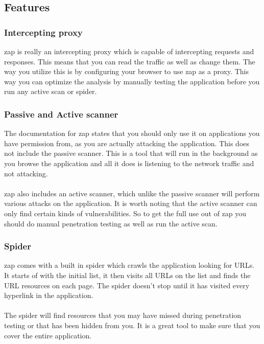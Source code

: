 \documentclass[11pt,english,a4paper]{report}
\begin{document}
\subsection{Features}
\subsubsection{Intercepting proxy}
\gls{zap} is really an intercepting proxy which is capable of intercepting requests and responses.
This means that you can read the traffic as well as change them.
The way you utilize this is by configuring your browser to use \gls{zap} as a proxy.
This way you can optimize the analysis by manually testing the application before you run any active scan or spider.
\subsubsection{Passive and Active scanner}
The documentation for \gls{zap} states that you should only use it on applications you have permission from, as you are actually attacking the application. 
This does not include the passive scanner. 
This is a tool that will run in the background as you browse the application and all it does is listening to the network traffic and not attacking. 

\paragraph{}
\gls{zap} also includes an active scanner, which unlike the passive scanner will perform various attacks on the application. 
It is worth noting that the active scanner can only find certain kinds of vulnerabilities. 
So to get the full use out of \gls{zap} you should do manual penetration testing as well as run the active scan.

\subsubsection{Spider}
\gls{zap} comes with a built in spider which crawls the application looking for URLs.
It starts of with the initial list, it then visits all URLs on the list and finds the URL resources on each page. 
The spider doesn't stop until it has visited every hyperlink in the application.

\paragraph{}
The spider will find resources that you may have missed during penetration testing or that has been hidden from you. 
It is a great tool to make sure that you cover the entire application.
\end{document}

